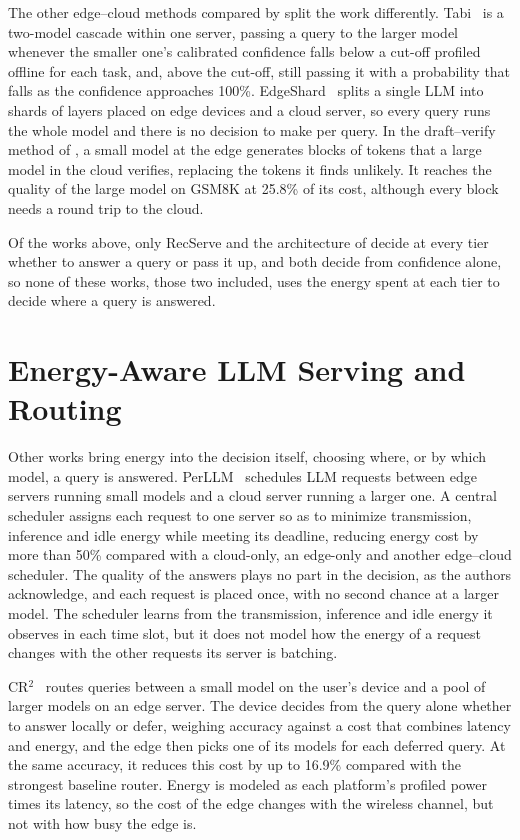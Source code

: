 \documentclass[cic,dipl,english]{infufrgs}
\begin{document}
The other edge--cloud methods compared by  split the
work differently. Tabi~\cite{wang2023tabi} is a two-model cascade within one server,
passing a query to the larger model whenever the smaller one's calibrated confidence falls
below a cut-off profiled offline for each task, and, above the cut-off, still passing it with a
probability that falls as the confidence approaches 100\%. EdgeShard~\cite{zhang2024edgeshard}
splits a single LLM into shards of layers placed on edge devices and a cloud server, so
every query runs the whole model and there is no decision to make per query. In the
draft--verify method of , a small model at the edge generates
blocks of tokens that a large model in the cloud verifies, replacing the tokens it finds
unlikely. It reaches the quality of the large model on GSM8K at 25.8\% of its cost,
although every block needs a round trip to the cloud.

Of the works above, only RecServe and the architecture of
 decide at every tier whether to answer a query
or pass it up, and both decide from confidence alone, so none of these works, those two
included, uses the energy spent at each tier to decide where a query is answered.

\section{Energy-Aware LLM Serving and Routing}
\label{sec:energy-routing}

Other works bring energy into the decision itself, choosing where, or by which model, a
query is answered. PerLLM~\cite{yang2024perllm} schedules LLM requests between edge servers running small
models and a cloud server running a larger one. A central scheduler assigns each request
to one server so as to minimize transmission, inference and idle energy while meeting
its deadline, reducing energy cost by more than 50\% compared with a cloud-only, an
edge-only and another edge--cloud scheduler. The quality of the answers plays no part in
the decision, as the authors acknowledge, and each request is placed once, with no
second chance at a larger model. The scheduler learns from the transmission, inference
and idle energy it observes in each time slot, but it does not model how the energy of a
request changes with the other requests its server is batching.

CR$^2$~\cite{xue2026cr2} routes queries between a small model on the user's device and
a pool of larger models on an edge server. The device decides from the query alone
whether to answer locally or defer, weighing accuracy against a cost that combines
latency and energy, and the edge then picks one of its models for each deferred query.
At the same accuracy, it reduces this cost by up to 16.9\% compared with the strongest
baseline router. Energy is modeled as each platform's profiled power times its latency,
so the cost of the edge changes with the wireless channel, but not with how busy the
edge is.
\end{document}
